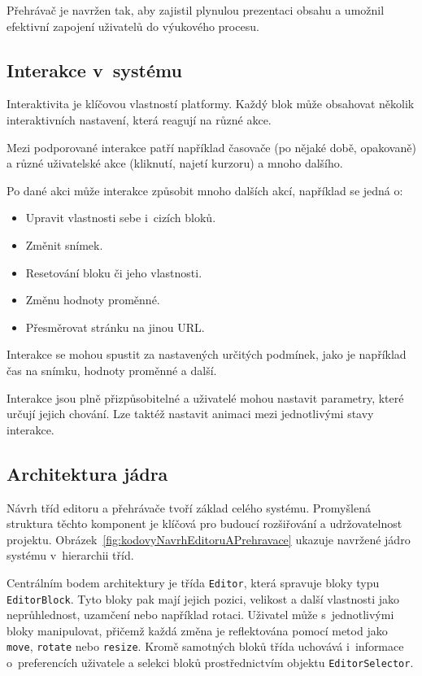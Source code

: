 Přehrávač je navržen tak, aby zajistil plynulou prezentaci obsahu a umožnil efektivní zapojení uživatelů do výukového procesu.

\subsection{Interakce v~systému}

Interaktivita je klíčovou vlastností platformy.
Každý blok může obsahovat několik interaktivních nastavení, která reagují na různé akce. 

Mezi podporované interakce patří například časovače (po nějaké době, opakovaně) a různé uživatelské akce (kliknutí, najetí kurzoru) a mnoho dalšího. 

Po dané akci může interakce způsobit mnoho dalších akcí, například se jedná o:

\begin{itemize}
    \item Upravit vlastnosti sebe i~cizích bloků.
    \item Změnit snímek.
    \item Resetování bloku či jeho vlastnosti.
    \item Změnu hodnoty proměnné. 
    \item Přesměrovat stránku na jinou URL.
\end{itemize}

Interakce se mohou spustit za nastavených určitých podmínek, jako je například čas na snímku, hodnoty proměnné a další.

Interakce jsou plně přizpůsobitelné a uživatelé mohou nastavit parametry, které určují jejich chování.
Lze taktéž nastavit animaci mezi jednotlivými stavy interakce.

\subsection{Architektura jádra}

Návrh tříd editoru a přehrávače tvoří základ celého systému. 
Promyšlená struktura těchto komponent je klíčová pro budoucí rozšiřování a udržovatelnost projektu.
Obrázek~\ref{fig:kodovyNavrhEditoruAPrehravace} ukazuje navržené jádro systému v~hierarchii tříd.

Centrálním bodem architektury je třída \texttt{Editor}, která spravuje bloky typu \texttt{EditorBlock}. 
Tyto bloky pak mají jejich pozici, velikost a další vlastnosti jako neprůhlednost, uzamčení nebo například rotaci. 
Uživatel může s~jednotlivými bloky manipulovat, přičemž každá změna je reflektována pomocí metod jako \texttt{move}, \texttt{rotate} nebo \texttt{resize}.
Kromě samotných bloků třída uchovává i~informace o~preferencích uživatele a selekci bloků prostřednictvím objektu \texttt{EditorSelector}.

